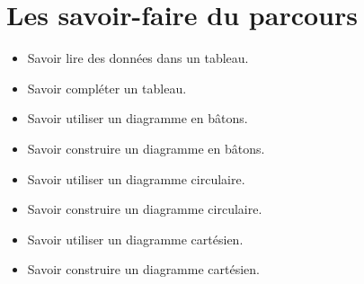 \documentclass[a4paper,dvipsnames]{article}
\begin{document}
\section{Les savoir-faire du parcours}

\begin{CpsCol}
\begin{itemize}
\item Savoir lire des données dans un tableau.
\item Savoir compléter un tableau.
\item Savoir utiliser un diagramme en bâtons.
\item Savoir construire un diagramme en bâtons.
\item Savoir utiliser un diagramme circulaire.
\item Savoir construire un diagramme circulaire.
\item Savoir utiliser un diagramme cartésien.
\item Savoir construire un diagramme cartésien.
\end{itemize}
\end{CpsCol}
\end{document}
